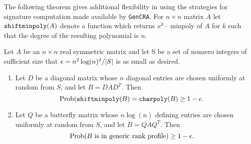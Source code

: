 \documentclass{acm_proc_article-sp}
\begin{document}


The following theorem gives additional flexibility in using the strategies
for signature computation made available by {\tt GenCRA}.
For $n\times n$ matrix $A$
let $\mbox{\tt shiftminpoly}(A)$ denote a function which returns 
$x^k \cdot $ minpoly of $A$ for $k$ such
that the degree of the resulting polynomial is $n$.
\begin{theorem} {\label{theorem:random}}
Let $A$ be an $n\times n$ real symmetric matrix and let S be a set of nonzero
integers of sufficient size that $\epsilon = n^2 \log(n)^2/|S|$ is as small as
desired.
\begin{enumerate}
\item
Let $D$ be a diagonal matrix whose $n$ diagonal entries are chosen
uniformly at random from $S$, 
and let $B = DAD^T$.  Then $$\mbox{Prob}(\mbox{\tt shiftminpoly}(B) = \mbox{\tt charpoly}(B) \geq 1 - \epsilon.$$
\item
Let $Q$ be a butterfly matrix whose $n \log (n)$ defining entries are chosen
uniformly at random from $S$, 
and let $B=QAQ^T$.
Then $$\mbox{Prob}(B \mbox{ is in generic rank profile}) \geq 1 - \epsilon.$$
\end{enumerate}
\end{theorem}
\end{document}
